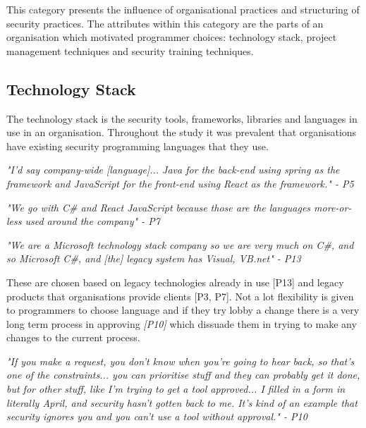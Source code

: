 This category presents the influence of organisational practices and structuring of security practices. The attributes within this category are the parts of an organisation which motivated programmer choices: technology stack, project management techniques and security training techniques. 

\subsection{Technology Stack}

\par The technology stack is the security tools, frameworks, libraries and languages in use in an organisation. Throughout the study it was prevalent that organisations have existing security programming languages that they use. 
\newline
\par
\textit{"I'd say company-wide [language]... Java for the back-end using spring as the framework and JavaScript for the front-end using React as the framework." - P5}
\newline
\par
\textit{"We go with C\# and React JavaScript because those are the languages more-or-less used around the company" - P7}
\newline
\par
\textit{"We are a Microsoft technology stack company so we are very much on C\#, and so Microsoft C\#, and [the] legacy system has Visual, VB.net" - P13}
\newline
\par
These are chosen based on legacy technologies already in use [P13] and legacy products that organisations provide clients [P3, P7].  Not a lot flexibility is given to programmers to choose language and if they try lobby a change there is a very long term process in approving \textit{[P10]} which dissuade them in trying to make any changes to the current process.
\newline
\par 
\textit{"If you make a request, you don't know when you're going to hear back, so that's one of the constraints... you can prioritise stuff and they can probably get it done, but for other stuff, like I'm trying to get a tool approved... I filled in a form in literally April, and security hasn't gotten back to me. It's kind of an example that security ignores you and you can't use a tool without approval." - P10}
\newline
\par

